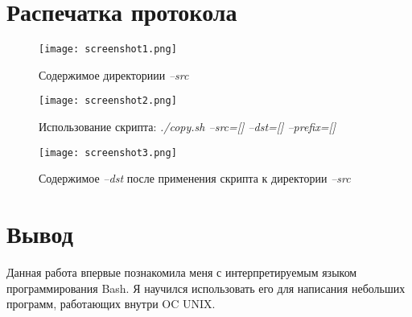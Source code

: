\documentclass[a4paper,12pt]{article}
\begin{document}
\newpage
\section*{Распечатка протокола}

\begin{figure}[h]
\centering
\texttt{[image: screenshot1.png]}
\caption{Содержимое директориии \textit{--src}}
\end{figure}

\begin{figure}[h]
\centering
\texttt{[image: screenshot2.png]}
\caption{Использование скрипта: \textit{./copy.sh --src=[] --dst=[] --prefix=[]}}
\end{figure}

\begin{figure}[h]
\centering
\texttt{[image: screenshot3.png]}
\caption{Содержимое \textit{--dst} после применения скрипта к директории \textit{--src}}
\end{figure}

\section*{Вывод}
Данная работа впервые познакомила меня с интерпретируемым языком программирования Bash.
Я научился использовать его для написания небольших программ, работающих внутри OC UNIX. 
\end{document}
